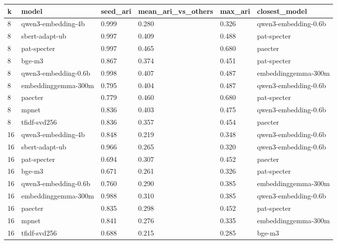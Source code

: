 \begin{tabular}{llllll}
\toprule
k & model & seed\_ari & mean\_ari\_vs\_others & max\_ari & closest\_model \\
\midrule
8 & qwen3-embedding-4b & 0.999 & 0.280 & 0.326 & qwen3-embedding-0.6b \\
8 & sbert-adapt-ub & 0.997 & 0.409 & 0.488 & pat-specter \\
8 & pat-specter & 0.997 & 0.465 & 0.680 & paecter \\
8 & bge-m3 & 0.867 & 0.374 & 0.451 & pat-specter \\
8 & qwen3-embedding-0.6b & 0.998 & 0.407 & 0.487 & embeddinggemma-300m \\
8 & embeddinggemma-300m & 0.795 & 0.404 & 0.487 & qwen3-embedding-0.6b \\
8 & paecter & 0.779 & 0.460 & 0.680 & pat-specter \\
8 & mpnet & 0.836 & 0.403 & 0.475 & qwen3-embedding-0.6b \\
8 & tfidf-svd256 & 0.836 & 0.357 & 0.454 & paecter \\
16 & qwen3-embedding-4b & 0.848 & 0.219 & 0.348 & qwen3-embedding-0.6b \\
16 & sbert-adapt-ub & 0.966 & 0.265 & 0.320 & qwen3-embedding-0.6b \\
16 & pat-specter & 0.694 & 0.307 & 0.452 & paecter \\
16 & bge-m3 & 0.671 & 0.261 & 0.326 & pat-specter \\
16 & qwen3-embedding-0.6b & 0.760 & 0.290 & 0.385 & embeddinggemma-300m \\
16 & embeddinggemma-300m & 0.988 & 0.310 & 0.385 & qwen3-embedding-0.6b \\
16 & paecter & 0.835 & 0.298 & 0.452 & pat-specter \\
16 & mpnet & 0.841 & 0.276 & 0.335 & embeddinggemma-300m \\
16 & tfidf-svd256 & 0.688 & 0.215 & 0.285 & bge-m3 \\
\bottomrule
\end{tabular}
